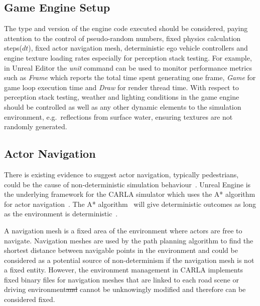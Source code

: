 \documentclass[letterpaper, 10 pt, journal, twoside]{IEEEtran}
\providecommand{\DIFaddtex}[1]{{\protect\color{blue}\uwave{#1}}} %
\providecommand{\DIFdeltex}[1]{{\protect\color{red}\sout{#1}}}                      %
\providecommand{\DIFaddbegin}{} %
\providecommand{\DIFaddend}{} %
\providecommand{\DIFdelbegin}{} %
\providecommand{\DIFdelend}{} %
\providecommand{\DIFadd}[1]{\texorpdfstring{\DIFaddtex{#1}}{#1}} %
\providecommand{\DIFdel}[1]{\texorpdfstring{\DIFdeltex{#1}}{}} %
\begin{document}
\subsection{Game Engine Setup}
The type and version of the engine code executed should be considered, paying attention to the control of pseudo-random numbers, fixed physics calculation steps\DIFaddbegin \DIFadd{, }\DIFaddend ($dt$), fixed actor navigation mesh, deterministic ego vehicle controllers and engine texture loading rates especially for perception stack testing. %
%
For example, in Unreal Editor the \textit{unit}\DIFaddbegin \DIFadd{~}\DIFaddend \cite{stat_commands} command can be used to monitor performance metrics such as \textit{Frame} which reports 
the total time spent generating one frame, \textit{Game} for game loop execution time and \textit{Draw} for render thread time. 
%
With respect to perception stack testing, weather and lighting conditions in the game engine should be controlled as well as any other dynamic elements to the simulation environment, e.g.\ reflections from surface water, ensuring textures are not randomly generated. 




\subsection{Actor Navigation}
There is existing evidence to suggest actor navigation, typically pedestrians, could be the cause of non-deterministic simulation behaviour~\cite{CARLABenchmark}.
% 
Unreal Engine is the underlying framework for the CARLA simulator which uses the A* algorithm for actor navigation~\cite{a_Star_oreilly}.
%
The A* algorithm~\cite{AStarBook} will give deterministic outcomes as long as the environment is deterministic~\cite{AirsimUnrealArticle, UnrealAIDocumentation}. 

A navigation mesh is a fixed area of the environment where actors are free to navigate.
%
Navigation meshes are used by the path planning algorithm to find the shortest distance between navigable points in the environment and could be considered as a potential source of non-determinism if the navigation mesh is not a fixed entity. %
%
However, the environment management in CARLA implements fixed binary files for navigation meshes that are linked to each road scene or driving environment\DIFdelbegin \DIFdel{and }\DIFdelend \DIFaddbegin \DIFadd{. These }\DIFaddend cannot be unknowingly modified and therefore can be considered fixed. 
\end{document}
